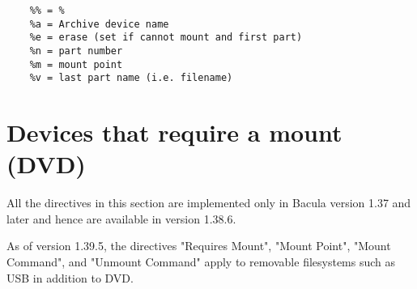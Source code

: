 \footnotesize
\begin{verbatim}
    %% = %
    %a = Archive device name
    %e = erase (set if cannot mount and first part)
    %n = part number
    %m = mount point
    %v = last part name (i.e. filename)
\end{verbatim}
\normalsize


\section{Devices that require a mount (DVD)}

All the directives in this section are implemented only in
Bacula version 1.37 and later and hence are available in version 1.38.6.

As of version 1.39.5, the directives
"Requires Mount", "Mount Point", "Mount Command", and "Unmount Command"
apply to removable filesystems such as USB in addition to DVD.

